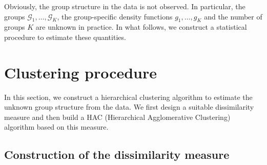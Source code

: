 \documentclass[a4paper,12pt]{article}
\numberwithin{equation}{section}
\begin{document}
Obviously, the group structure in the data is not observed. In particular, the groups $\mathcal{G}_1,\ldots,\mathcal{G}_K$, the group-specific density functions $g_1,\ldots,g_K$ and the number of groups $K$ are unknown in practice. In what follows, we construct a statistical procedure to estimate these quantities. 



\section{Clustering procedure}


In this section, we construct a hierarchical clustering algorithm to estimate the unknown group structure from the data. We first design a suitable dissimilarity measure and then build a HAC (Hierarchical Agglomerative Clustering) algorithm based on this measure.


\subsection{Construction of the dissimilarity measure}\label{subsec:diss}
\end{document}

